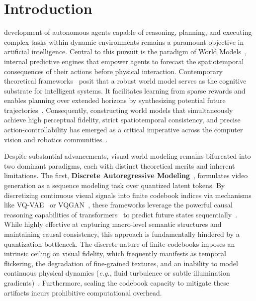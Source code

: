 \section{Introduction}
\label{sec1:Intro}

 development of autonomous agents capable of reasoning, planning, and executing complex tasks within dynamic environments remains a paramount objective in artificial intelligence. Central to this pursuit is the paradigm of World Models~\cite{ha2018world, hafner2019dream}, internal predictive engines that empower agents to forecast the spatiotemporal consequences of their actions before physical interaction. Contemporary theoretical frameworks~\cite{lecun2022path} posit that a robust world model serves as the cognitive substrate for intelligent systems. It facilitates learning from sparse rewards and enables planning over extended horizons by synthesizing potential future trajectories~\cite{hafner2020dreamerv2, hafner2023dreamerv3}. Consequently, constructing world models that simultaneously achieve high perceptual fidelity, strict spatiotemporal consistency, and precise action-controllability has emerged as a critical imperative across the computer vision and robotics communities~\cite{bruce2024genie, wu2024ivideogpt, wang2025sampo}.

Despite substantial advancements, visual world modeling remains bifurcated into two dominant paradigms, each with distinct theoretical merits and inherent limitations. The first, \textbf{Discrete Autoregressive Modeling}~\cite{van2017neural, esser2021taming}, formulates video generation as a sequence modeling task over quantized latent tokens. By discretizing continuous visual signals into finite codebook indices via mechanisms like VQ-VAE~\cite{van2017neural} or VQGAN~\cite{esser2021taming}, these frameworks leverage the powerful causal reasoning capabilities of transformers~\cite{vaswani2017attention, brown2020language} to predict future states sequentially~\cite{yan2021videogpt, rakhimov2020latent}. While highly effective at capturing macro-level semantic structures and maintaining causal consistency, this approach is fundamentally hindered by a quantization bottleneck. The discrete nature of finite codebooks imposes an intrinsic ceiling on visual fidelity, which frequently manifests as temporal flickering, the degradation of fine-grained textures, and an inability to model continuous physical dynamics (\textit{e.g.}, fluid turbulence or subtle illumination gradients)~\cite{yu2023magvit, yu2023language}. Furthermore, scaling the codebook capacity to mitigate these artifacts incurs prohibitive computational overhead.

